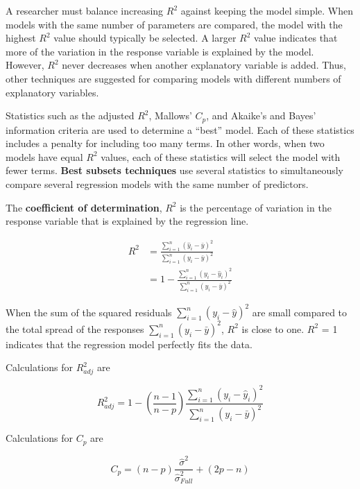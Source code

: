 \documentclass[
]{report}
\begin{document}
A researcher must balance increasing \(R^2\) against keeping the model simple. When models with the same number of parameters are compared, the model with the highest \(R^2\) value should typically be selected. A larger \(R^2\) value indicates that more of the variation in the response variable is explained by the model. However, \(R^2\) never decreases when another explanatory variable is added. Thus, other techniques are suggested for comparing models with different numbers of explanatory variables.

Statistics such as the adjusted \(R^2\), Mallows' \(C_p\), and Akaike's and Bayes' information criteria are used to determine a ``best'' model. Each of these statistics includes a penalty for including too many terms. In other words, when two models have equal \(R^2\) values, each of these statistics will select the model with fewer terms. \textbf{Best subsets techniques} use several statistics to simultaneously compare several regression models with the same number of predictors.

The \textbf{coefficient of determination}, \textbf{\(R^2\)} is the percentage of variation in the response variable that is explained by the regression line.

\begin{align}\label{R2}
R^2 &= \frac{\sum_{i=1}^{n}(\hat{y}_i - \bar{y})^2}{\sum_{i=1}^{n}({y}_i - \bar{y})^2} \\
    &= 1 - \frac{\sum_{i=1}^{n}({y}_i - \hat{y}_i)^2}{\sum_{i=1}^{n}({y}_i - \bar{y})^2}
\tag{3.2}
\end{align}

When the sum of the squared residuals \({\sum_{i=1}^{n}({y}_i - \hat{y})^2}\) are small compared to the total spread of the responses \({\sum_{i=1}^{n}({y}_i - \bar{y})^2}\), \(R^2\) is close to one. \(R^2\) = 1 indicates that the regression model perfectly fits the data.

Calculations for \(R^2_{adj}\) are

\begin{equation}\label{R2Adj}
R^2_{adj}  = 1 - (\frac{n-1}{n-p})\frac{\sum_{i=1}^{n}({y}_i - \hat{y}_i)^2}{\sum_{i=1}^{n}({y}_i - \bar{y})^2}
\tag{3.3}
\end{equation}

Calculations for \(C_p\) are

\begin{equation}\label{Cp}
C_p  = (n-p)\frac{\hat{\sigma}^2}{\hat{\sigma}^2_{Full}} + (2p-n)
\tag{3.4}
\end{equation}
\end{document}
